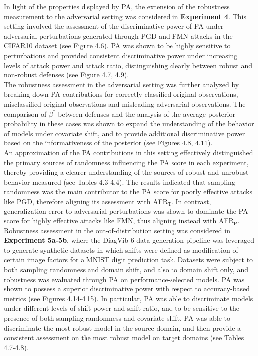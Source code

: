 In light of the properties displayed by PA, the extension of the robustness measurement to the adversarial setting
was considered in \textbf{Experiment 4}. This setting involved the assessment of the discriminative power of PA under
adversarial perturbations generated through PGD and FMN attacks in the CIFAR10 dataset (see Figure 4.6). PA was shown to be
highly sensitive to perturbations and provided consistent discriminative power under increasing levels of 
attack power and attack ratio, distinguishing clearly between robust and non-robust defenses (see Figure 4.7, 4.9). \\

The robustness assessment in the adversarial setting was further analyzed by breaking down PA contributions for
correctly classified original observations, misclassified original observations and misleading adversarial observations.
The comparison of $\beta^{*}$ between defenses and the analysis of the average posterior probability in these cases
was shown to expand the understanding of the behavior of models under covariate shift, and to provide additional
discriminative power based on the informativeness of the posterior (see Figures 4.8, 4.11). \\

An approximation of the PA contributions in this setting effectively distinguished the primary sources 
of randomness influencing the PA score in each experiment, thereby providing a clearer understanding
of the sources of robust and unrobust behavior measured (see Tables 4.3-4.4). The results indicated that sampling 
randomness was the main contributor to the PA score for poorly effective attacks like PGD, therefore aligning 
its assessment with AFR$_{\text{T}}$. In contrast, generalization error to adversarial perturbations
was shown to dominate the PA score for highly effective attacks like FMN, thus aligning instead with AFR$_{\text{P}}$. \\

Robustness assessment in the out-of-distribution setting was considered in \textbf{Experiment 5a-5b}, 
where the DiagVib-6 data generation pipeline was leveraged to generate synthetic datasets in which shifts were
defined as modification of certain image factors for a MNIST digit prediction task. Datasets were subject to
both sampling randomness and domain shift, and also to domain shift only, and robustness was evaluated through PA 
on performance-selected models. PA was shown to possess a
superior discriminative power with respect to accuracy-based metrics (see Figures 4.14-4.15). In particular, PA was able to discriminate
models under different levels of shift power and shift ratio, and to be sensitive to the presence of 
both sampling randomness and covariate shift. PA was able to discriminate the most robust model in the source domain, 
and then provide a consistent assessment on the most robust model on target domains (see Tables 4.7-4.8). \\
 
